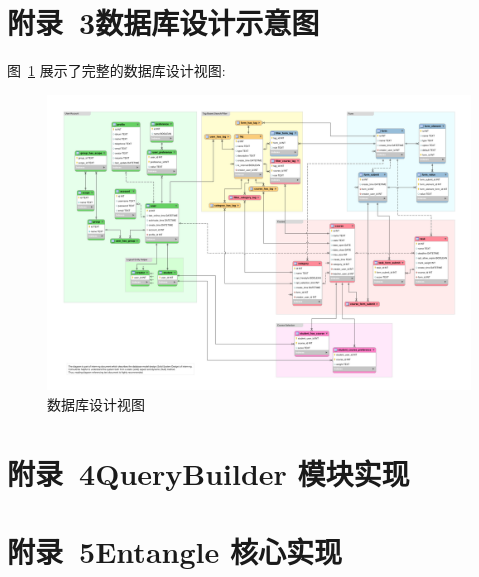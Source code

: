 
\newpage

\section*{附录~3\quad	数据库设计示意图}
\label{sec:appendix-database-diagram}

图~\ref{FullDatabaseDesign} 展示了完整的数据库设计视图:

\begin{figure}[!h]
  \begin{center}
    \includegraphics[angle=90, scale=0.5]{figures/eer-120dpi.png}
    \caption{数据库设计视图\label{FullDatabaseDesign}}
  \end{center}
\end{figure}

\newpage

\section*{附录~4\quad	QueryBuilder 模块实现}



\newpage

\section*{附录~5\quad	Entangle 核心实现}



